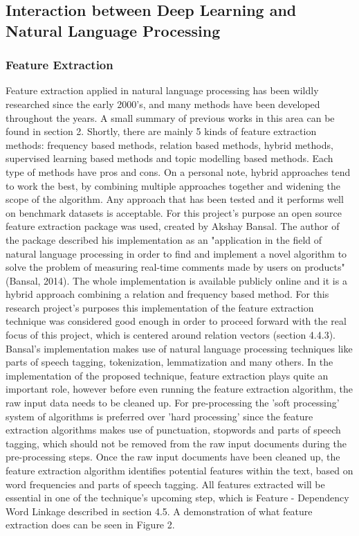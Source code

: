 \documentclass{sig-alternate}
\begin{document}
\subsection{Interaction between Deep Learning and Natural Language Processing}
\subsubsection{Feature Extraction}
Feature extraction applied in natural language processing has been wildly researched since the early 2000's, and many methods have been developed throughout the years. A small summary of previous works in this area can be found in section 2. Shortly, there are mainly 5 kinds of feature extraction methods: frequency based methods, relation based methods, hybrid methods, supervised learning based methods and topic modelling based methods. Each type of methods have pros and cons. On a personal note, hybrid approaches tend to work the best, by combining multiple approaches together and widening the scope of the algorithm. Any approach that has been tested and it performs well on benchmark datasets is acceptable. For this project's purpose an open source feature extraction package was used, created by Akshay Bansal. The author of the package described his implementation as an "application in the field of natural language processing in order to find and implement a novel algorithm to solve the problem of measuring real-time comments made by users on products" (Bansal, 2014). The whole implementation is available publicly online and it is a hybrid approach combining a relation and frequency based method. For this research project's purposes this implementation of the feature extraction technique was considered good enough in order to proceed forward with the real focus of this project, which is centered around relation vectors (section 4.4.3). Bansal's implementation makes use of natural language processing techniques like parts of speech tagging, tokenization, lemmatization and many others. 
In the implementation of the proposed technique, feature extraction plays quite an important role, however before even running the feature extraction algorithm, the raw input data needs to be cleaned up. For pre-processing the 'soft processing' system of algorithms is preferred over 'hard processing' since the feature extraction algorithms makes use of punctuation, stopwords and parts of speech tagging, which should not be removed from the raw input documents during the pre-processing steps. Once the raw input documents have been cleaned up, the feature extraction algorithm identifies potential features within the text, based on word frequencies and parts of speech tagging. All features extracted will be essential in one of the technique's upcoming step, which is Feature - Dependency Word Linkage described in section 4.5. A demonstration of what feature extraction does can be seen in Figure 2.
\end{document}
